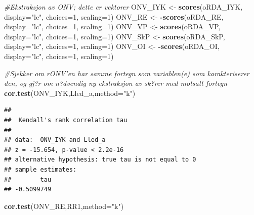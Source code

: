 \documentclass[]{article}
\newenvironment{Shaded}{\begin{snugshade}}{\end{snugshade}}
\newcommand{\CommentTok}[1]{\textcolor[rgb]{0.56,0.35,0.01}{\textit{#1}}}
\newcommand{\DataTypeTok}[1]{\textcolor[rgb]{0.13,0.29,0.53}{#1}}
\newcommand{\DecValTok}[1]{\textcolor[rgb]{0.00,0.00,0.81}{#1}}
\newcommand{\KeywordTok}[1]{\textcolor[rgb]{0.13,0.29,0.53}{\textbf{#1}}}
\newcommand{\NormalTok}[1]{#1}
\newcommand{\OperatorTok}[1]{\textcolor[rgb]{0.81,0.36,0.00}{\textbf{#1}}}
\newcommand{\StringTok}[1]{\textcolor[rgb]{0.31,0.60,0.02}{#1}}
\begin{document}
\begin{Shaded}
\begin{Highlighting}[]
\CommentTok{#Ekstraksjon av ONV; dette er vektorer}
\NormalTok{ONV_IYK <-}\StringTok{ }\KeywordTok{scores}\NormalTok{(oRDA_IYK, }\DataTypeTok{display=}\StringTok{"lc"}\NormalTok{, }\DataTypeTok{choices=}\DecValTok{1}\NormalTok{, }\DataTypeTok{scaling=}\DecValTok{1}\NormalTok{)}
\NormalTok{ONV_RE <-}\StringTok{ }\OperatorTok{-}\KeywordTok{scores}\NormalTok{(oRDA_RE, }\DataTypeTok{display=}\StringTok{"lc"}\NormalTok{, }\DataTypeTok{choices=}\DecValTok{1}\NormalTok{, }\DataTypeTok{scaling=}\DecValTok{1}\NormalTok{)}
\NormalTok{ONV_VP <-}\StringTok{ }\KeywordTok{scores}\NormalTok{(oRDA_VP, }\DataTypeTok{display=}\StringTok{"lc"}\NormalTok{, }\DataTypeTok{choices=}\DecValTok{1}\NormalTok{, }\DataTypeTok{scaling=}\DecValTok{1}\NormalTok{)}
\NormalTok{ONV_SkP <-}\StringTok{ }\KeywordTok{scores}\NormalTok{(oRDA_SkP, }\DataTypeTok{display=}\StringTok{"lc"}\NormalTok{, }\DataTypeTok{choices=}\DecValTok{1}\NormalTok{, }\DataTypeTok{scaling=}\DecValTok{1}\NormalTok{)}
\NormalTok{ONV_OI <-}\StringTok{ }\OperatorTok{-}\KeywordTok{scores}\NormalTok{(oRDA_OI, }\DataTypeTok{display=}\StringTok{"lc"}\NormalTok{, }\DataTypeTok{choices=}\DecValTok{1}\NormalTok{, }\DataTypeTok{scaling=}\DecValTok{1}\NormalTok{)}
\end{Highlighting}
\end{Shaded}

\begin{Shaded}
\begin{Highlighting}[]
\CommentTok{#Sjekker om rONV'en har samme fortegn som variablen(e) som karakteriserer den, og gj?r om n?dvendig ny ekstraksjon av sk?rer med motsatt fortegn}
\KeywordTok{cor.test}\NormalTok{(ONV_IYK,Lled_a,}\DataTypeTok{method=}\StringTok{"k"}\NormalTok{)}
\end{Highlighting}
\end{Shaded}

\begin{verbatim}
## 
##  Kendall's rank correlation tau
## 
## data:  ONV_IYK and Lled_a
## z = -15.654, p-value < 2.2e-16
## alternative hypothesis: true tau is not equal to 0
## sample estimates:
##        tau 
## -0.5099749
\end{verbatim}

\begin{Shaded}
\begin{Highlighting}[]
\KeywordTok{cor.test}\NormalTok{(ONV_RE,RR1,}\DataTypeTok{method=}\StringTok{"k"}\NormalTok{)}
\end{Highlighting}
\end{Shaded}
\end{document}
